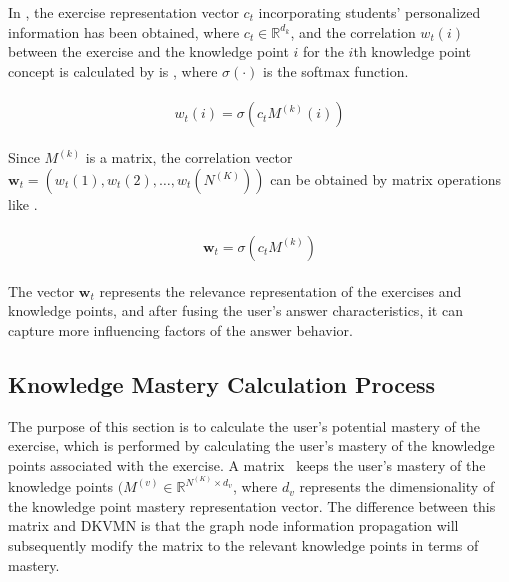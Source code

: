 In \eqname{\ref{fml:ch3-sbcap}}, the exercise representation vector \(c_t\) incorporating students' personalized information has been obtained, where \(c_t\in\mathbb{R}^{d_k}\), and the correlation \(w_t(i)\) between the exercise and the knowledge point \(i\) for the \(i\)th knowledge point concept is calculated by is \eqname{\ref{fml:ch3-corkq}}, where \(\sigma(\cdot)\) is the softmax function.

\begin{align}\label{fml:ch3-corkq}
    \begin{split}
        w_t(i)=\sigma(c_t M^{(k)}(i))
    \end{split}
\end{align}

Since \(M^{(k)}\) is a matrix, the correlation vector \(\mathbf{w}_t=(w_t(1),w_t(2),\ldots,w_t(N^{(K)}))\) can be obtained by matrix operations like \eqname{\ref{fml:ch3-corkq-mat}}.

\begin{align}\label{fml:ch3-corkq-mat}
    \begin{split}
        \mathbf{w}_t=\sigma(c_t M^{(k)})
    \end{split}
\end{align}

The vector \(\mathbf{w}_t\) represents the relevance representation of the exercises and knowledge points, and after fusing the user's answer characteristics, it can capture more influencing factors of the answer behavior.

\subsection{Knowledge Mastery Calculation Process}

The purpose of this section is to calculate the user's potential mastery of the exercise, which is performed by calculating the user's mastery of the knowledge points associated with the exercise. A matrix \ keeps the user's mastery of the knowledge points \((M^{(v)}\in\mathbb{R}^{N^{(K)}\times d_v}\), where \(d_v\) represents the dimensionality of the knowledge point mastery representation vector. The difference between this matrix and DKVMN is that the graph node information propagation will subsequently modify the matrix to the relevant knowledge points in terms of mastery.

